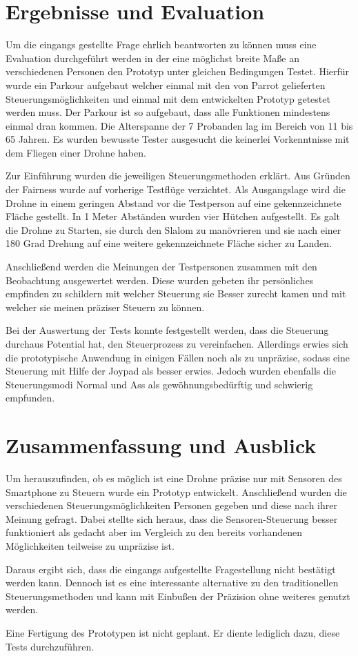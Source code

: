 \documentclass{article}
\begin{document}
\section{Ergebnisse und Evaluation}
Um die eingangs gestellte Frage ehrlich beantworten zu können muss eine Evaluation durchgeführt werden in der eine möglichst breite Maße an verschiedenen Personen den Prototyp unter gleichen Bedingungen Testet. Hierfür wurde ein Parkour aufgebaut welcher einmal mit den von Parrot gelieferten Steuerungsmöglichkeiten und einmal mit dem entwickelten Prototyp getestet werden muss. Der Parkour ist so aufgebaut, dass alle Funktionen mindestens einmal dran kommen. Die Alterspanne der 7 Probanden lag im Bereich von 11 bis 65 Jahren. Es wurden bewusste Tester ausgesucht die keinerlei Vorkenntnisse mit dem Fliegen einer Drohne haben. 

Zur Einführung wurden die jeweiligen Steuerungsmethoden erklärt. Aus Gründen der Fairness wurde auf vorherige Testflüge verzichtet. Als Ausgangslage wird die Drohne in einem geringen Abstand vor die Testperson auf eine gekennzeichnete Fläche gestellt. In 1 Meter Abständen wurden vier Hütchen aufgestellt. Es galt die Drohne zu Starten, sie durch den Slalom zu manövrieren und sie nach einer 180 Grad Drehung auf eine weitere gekennzeichnete Fläche sicher zu Landen. 

Anschließend werden die Meinungen der Testpersonen zusammen mit den Beobachtung ausgewertet werden. Diese wurden gebeten ihr persönliches empfinden zu schildern mit welcher Steuerung sie Besser zurecht kamen und mit welcher sie meinen präziser Steuern zu können.

Bei der Auswertung der Tests konnte festgestellt werden, dass die Steuerung durchaus Potential hat, den Steuerprozess zu vereinfachen. Allerdings erwies sich die prototypische Anwendung in einigen Fällen noch als zu unpräzise, sodass eine Steuerung mit Hilfe der Joypad als besser erwies. Jedoch wurden ebenfalls die Steuerungsmodi Normal und Ass als gewöhnungsbedürftig und schwierig empfunden.

\section{Zusammenfassung und Ausblick}
Um herauszufinden, ob es möglich ist eine Drohne präzise nur mit Sensoren des Smartphone zu Steuern wurde ein Prototyp entwickelt. Anschließend wurden die verschiedenen Steuerungsmöglichkeiten Personen gegeben und diese nach ihrer Meinung gefragt. Dabei stellte sich heraus, dass die Sensoren-Steuerung besser funktioniert als gedacht aber im Vergleich zu den bereits vorhandenen Möglichkeiten teilweise zu unpräzise ist. 

Daraus ergibt sich, dass die eingangs aufgestellte Fragestellung nicht bestätigt werden kann. Dennoch ist es eine interessante alternative zu den traditionellen Steuerungsmethoden und kann mit Einbußen der Präzision ohne weiteres genutzt werden.

Eine Fertigung des Prototypen ist nicht geplant. Er diente lediglich dazu, diese Tests durchzuführen.

{}

\end{document}
